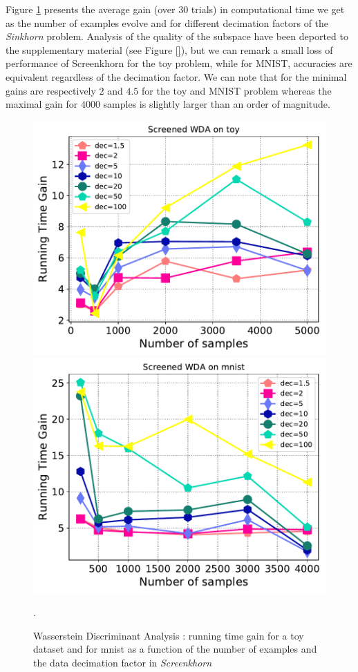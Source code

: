 Figure \ref{fig:wda} presents the average gain (over $30$ trials) in computational time we get as the number of examples evolve and for different decimation factors of the \emph{Sinkhorn} problem.
Analysis of the quality of the subspace have been deported to the supplementary material (see Figure \ref{}), but we can remark a small loss of performance of Screenkhorn for the toy problem, while
for MNIST, accuracies are equivalent regardless of the decimation factor.  We can note
that for the minimal gains are respectively $2$ and $4.5$ for the toy and MNIST problem
whereas the maximal gain for $4000$ samples is slightly larger than an order of magnitude. 

\begin{figure}[t]
	\centering
	\includegraphics[width=6.cm]{./figs/wda_gain_toy.pdf}
\includegraphics[width=6.cm]{./figs/wda_gain_mnist.pdf}
	\caption{Wasserstein Discriminant Analysis : running time gain for a toy dataset and for mnist as a function of the number of examples and the data decimation factor in \emph{Screenkhorn}}.
	\label{fig:wda}
\end{figure}
